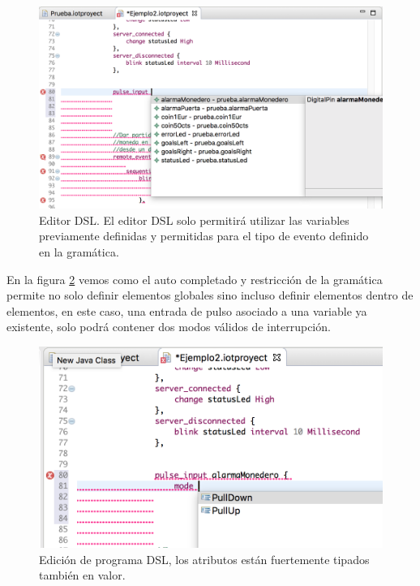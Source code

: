 \begin{figure}
	\centering
    \includegraphics[scale=0.4]{images/emf_capturas/autocompletado_dsl_2.png}
    \caption[Editor DSL - Restricción en variables]{Editor DSL. El editor DSL solo permitirá utilizar las variables previamente definidas y permitidas para el tipo de evento definido en la gramática.}
    \label{fig:dsl_autocompletado_2}
\end{figure}

En la figura \ref{fig:dsl_autocompletado_3} vemos como el auto completado y restricción de la gramática permite no solo definir elementos globales sino incluso definir elementos dentro de elementos, en este caso, una entrada de pulso asociado a una variable ya existente, solo podrá contener dos modos válidos de interrupción.

\begin{figure}
	\centering
    \includegraphics[scale=0.4]{images/emf_capturas/autocompletado_dsl_3.png}
    \sourcepropia{}
    \caption[Editor DSL - Tipado en atributos]{Edición de programa DSL, los atributos están fuertemente tipados también en valor.}
    \label{fig:dsl_autocompletado_3}
\end{figure}

